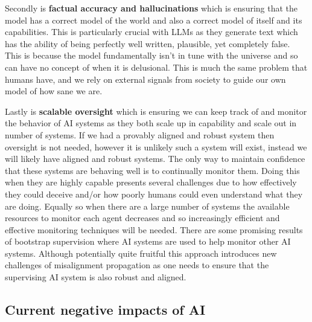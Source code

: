 Secondly is \textbf{factual accuracy and hallucinations} which is ensuring that the model has a correct model of the world and also a correct model of itself and its capabilities. This is particularly crucial with LLMs as they generate text which has the ability of being perfectly well written, plausible, yet completely false. This is because the model fundamentally isn't in tune with the universe and so can have no concept of when it is delusional. This is much the same problem that humans have, and we rely on external signals from society to guide our own model of how sane we are.

Lastly is \textbf{scalable oversight} which is ensuring we can keep track of and monitor the behavior of AI systems as they both scale up in capability and scale out in number of systems. If we had a provably aligned and robust system then oversight is not needed, however it is unlikely such a system will exist, instead we will likely have  aligned and robust systems. The only way to maintain confidence that these systems are behaving well is to continually monitor them. Doing this when they are highly capable presents several challenges due to how effectively they could deceive and/or how poorly humans could even understand what they are doing. Equally so when there are a large number of systems the available resources to monitor each agent decreases and so increasingly efficient and effective monitoring techniques will be needed. There are some promising results of bootstrap supervision \cite{bowmanMeasuringProgressScalable2022,engelsScalingLawsScalable2025,kentonScalableOversightWeak2024a} where AI systems are used to help monitor other AI systems. Although potentially quite fruitful this approach introduces new challenges of misalignment propagation as one needs to ensure that the supervising AI system is also robust and aligned.

\subsection{Current negative impacts of AI}

